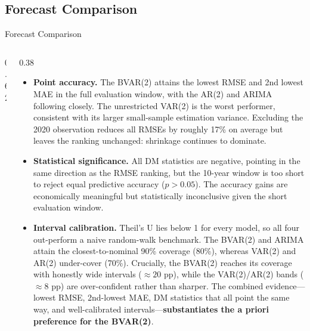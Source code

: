 \documentclass[9pt]{beamer}
\begin{document}
\subsection{Forecast Comparison}
\begin{frame}{Forecast Comparison}\label{slide:forecast-comp}

\small

\begin{columns}
  \begin{column}{0.62\textwidth}
\vspace{-0.2cm}
    {\fontsize{5}{5.5}\selectfont
    \setlength{\tabcolsep}{1.2pt}
    \setlength{\abovecaptionskip}{1pt}
    \setlength{\belowcaptionskip}{1pt}
    
    \vspace{0.1cm}
    
    \vspace{0.1cm}
    
    }
  \end{column}

  \begin{column}{0.38\textwidth}
    \tiny
    \begin{itemize}\setlength{\itemsep}{2pt}\setlength{\parskip}{0pt}
      \item \textbf{Point accuracy.} The BVAR(2) attains the lowest RMSE and 2nd lowest MAE in the full evaluation window, with the AR(2) and ARIMA following closely. The unrestricted VAR(2) is the worst performer, consistent with its larger small-sample estimation variance. Excluding the 2020 observation reduces all RMSEs by roughly 17\% on average but leaves the ranking unchanged: shrinkage continues to dominate.

      \item \textbf{Statistical significance.} All DM statistics are negative, pointing in the same direction as the RMSE ranking, but the 10-year window is too short to reject equal predictive accuracy ($p > 0.05$). The accuracy gains are economically meaningful but statistically inconclusive given the short evaluation window.

      \item \textbf{Interval calibration.} Theil's U lies below 1 for every model, so all four out-perform a naive random-walk benchmark. The BVAR(2) and ARIMA attain the closest-to-nominal 90\% coverage (80\%), whereas VAR(2) and AR(2) under-cover (70\%). Crucially, the BVAR(2) reaches its coverage with honestly wide intervals ($\approx 20$ pp), while the VAR(2)/AR(2) bands ($\approx 8$ pp) are over-confident rather than sharper. The combined evidence---lowest RMSE, 2nd-lowest MAE, DM statistics that all point the same way, and well-calibrated intervals---\textbf{substantiates the a priori preference for the BVAR(2)}.
    \end{itemize}
  \end{column}
\end{columns}

\end{frame}
\end{document}
